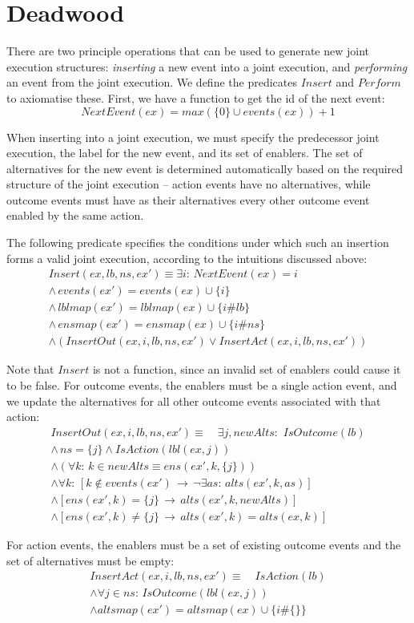 \section{Deadwood}

There are two principle operations that can be used to generate new
joint execution structures: \emph{inserting} a new event into a joint
execution, and \emph{performing} an event from the joint execution.
We define the predicates $Insert$ and $Perform$ to axiomatise these.
First, we have a function to get the id of the next event:\[
NextEvent(ex)=max(\{0\}\cup events(ex))+1\]


When inserting into a joint execution, we must specify the predecessor
joint execution, the label for the new event, and its set of enablers.
The set of alternatives for the new event is determined automatically
based on the required structure of the joint execution -- action events
have no alternatives, while outcome events must have as their alternatives
every other outcome event enabled by the same action.

The following predicate specifies the conditions under which such
an insertion forms a valid joint execution, according to the intuitions
discussed above:\begin{gather*}
Insert(ex,lb,ns,ex')\equiv\exists i:\, NextEvent(ex)=i\\
\wedge\, events(ex')=events(ex)\cup\{i\}\\
\wedge\, lblmap(ex')=lblmap(ex)\cup\{i\#lb\}\\
\wedge\, ensmap(ex')=ensmap(ex)\cup\{i\#ns\}\\
\wedge\left(InsertOut(ex,i,lb,ns,ex')\vee InsertAct(ex,i,lb,ns,ex')\right)\end{gather*}


Note that $Insert$ is not a function, since an invalid set of enablers
could cause it to be false. For outcome events, the enablers must
be a single action event, and we update the alternatives for all other
outcome events associated with that action:\begin{gather*}
InsertOut(ex,i,lb,ns,ex')\equiv\,\,\,\,\,\,\exists j,newAlts:\,\, IsOutcome(lb)\\
\wedge\, ns=\{j\}\wedge IsAction(lbl(ex,j))\\
\wedge\left(\forall k:\, k\in newAlts\equiv ens(ex',k,\{j\})\right)\\
\wedge\forall k:\,\left[k\not\in events(ex')\,\rightarrow\,\neg\exists as:\, alts(ex',k,as)\right]\\
\wedge\left[ens(ex',k)=\{j\}\,\rightarrow\, alts(ex',k,newAlts)\right]\\
\wedge\left[ens(ex',k)\neq\{j\}\,\rightarrow\, alts(ex',k)=alts(ex,k)\right]\end{gather*}


For action events, the enablers must be a set of existing outcome
events and the set of alternatives must be empty:\begin{gather*}
InsertAct(ex,i,lb,ns,ex')\equiv\,\,\,\,\,\, IsAction(lb)\\
\wedge\forall j\in ns:\, IsOutcome(lbl(ex,j))\\
\wedge altsmap(ex')=altsmap(ex)\cup\{i\#\{\}\}\end{gather*}


